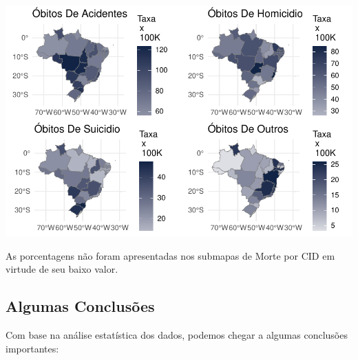 \documentclass[
]{article}
\let\origfigure\figure
\let\endorigfigure\endfigure
\renewenvironment{figure}[1][2] {
    \expandafter\origfigure\expandafter[H]
} {
    \endorigfigure
}
\begin{document}
\begin{figure}
\centering
\includegraphics{RelatorioV02_files/figure-latex/unnamed-chunk-22-1.pdf}
\caption{Mulheres em período fértil separados por CID}
\end{figure}

As porcentagens não foram apresentadas nos submapas de Morte por CID em
virtude de seu baixo valor.

\hypertarget{algumas-conclusuxf5es}{%
\subsection{Algumas Conclusões}\label{algumas-conclusuxf5es}}

Com base na análise estatística dos dados, podemos chegar a algumas
conclusões importantes:
\end{document}
